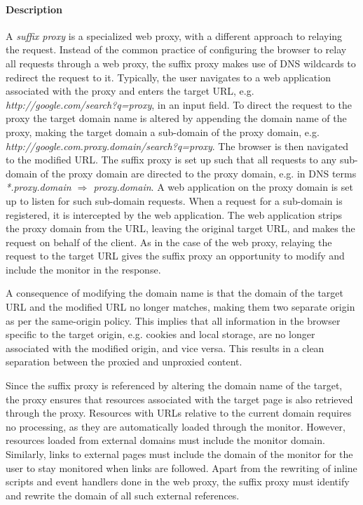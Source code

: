 \documentclass{llncs}
\begin{document}
\paragraph{Description}
A \emph{suffix proxy} is a specialized web proxy, with a different approach to relaying the request. 
Instead of the common practice of configuring the browser to relay all requests through a web proxy,
the suffix proxy makes use of DNS wildcards to redirect the request to it.
Typically, the user navigates to a 
web application associated with the proxy and enters the target URL, e.g. \emph{http://google.com/search?q=proxy}, in 
an input field. To direct the request to the proxy the target domain name is altered
by appending the domain name of the proxy, making the target domain a sub-domain of the proxy domain, e.g. \emph{http://google.com.proxy.domain/search?q=proxy}. 
The browser is then navigated to the modified URL.
The suffix proxy is set up such
that all requests to any sub-domain of the proxy domain are directed to the proxy domain, 
e.g. in DNS terms \emph{*.proxy.domain $\Rightarrow$ proxy.domain}. 
A web application on the proxy domain is set up to listen for such sub-domain requests.
When a request for a sub-domain is registered, it is intercepted by the web application.
The web application strips the proxy domain from the URL, leaving the original target URL, 
and makes the request on behalf of the client. As in the case of the web proxy, 
relaying the request to the target URL gives the suffix proxy an opportunity to modify and 
include the monitor in the response.

A consequence of modifying the domain name is that the domain of the
target URL and the modified URL no longer matches, making them two 
separate origin as per the same-origin policy. This implies that all information in 
the browser specific to the target origin, e.g. cookies and local storage, 
are no longer associated with the modified origin, and vice versa. This results 
in a clean separation between the proxied and unproxied content.  

Since the suffix proxy is referenced by altering the domain name of the target, 
the proxy ensures that resources associated with the target page is also 
retrieved through the proxy. Resources with URLs relative to the current domain 
requires no processing, as they are automatically loaded through the monitor. 
However, resources loaded from external domains must 
include the monitor domain. Similarly, links to external pages must include the domain of the monitor 
for the user to stay %
monitored %
when links are followed.
Apart from the rewriting of inline 
scripts and event handlers done in the web proxy, the suffix proxy must 
identify and rewrite the domain of all such external references. 
\end{document}
